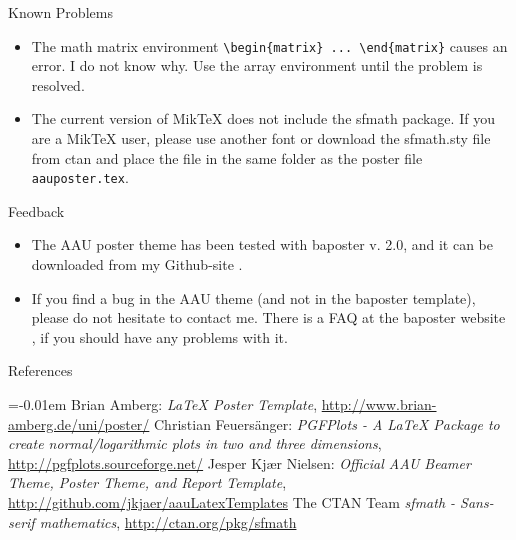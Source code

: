 \documentclass[a0paper,portrait]{baposter}
\begin{document}
\begin{poster}
\begin{posterbox}[name=problems,column=2,below=install]{Known Problems}
  \begin{itemize}
    \item The math matrix environment {\tt \textbackslash begin\{matrix\} ... \textbackslash end\{matrix\}} causes an error. I do not know why. Use the array environment until the problem is resolved.
    \item The current version of MikTeX does not include the sfmath package. If you are a MikTeX user, please use another font or download the sfmath.sty file from ctan \cite{ctan} and place the file in the same folder as the poster file {\tt aauposter.tex}.
  \end{itemize}
\end{posterbox}

\begin{posterbox}[name=feedback,column=2,below=problems]{Feedback}
  \begin{itemize}
    \item The AAU poster theme has been tested with baposter v. 2.0, and it can be downloaded from my Github-site \cite{jkngithub}.
    \item If you find a bug in the AAU theme (and not in the baposter template), please do not hesitate to contact me. There is a FAQ at the baposter website \cite{baposter}, if you should have any problems with it.
  \end{itemize}
\end{posterbox}

\begin{posterbox}[name=refs,column=2,below=feedback,above=bottom]{References}


\begin{thebibliography}{1}%
\itemsep=-0.01em%
\setlength{\baselineskip}{0.4em}%
 Brian Amberg: \emph{LaTeX Poster Template}, \url{http://www.brian-amberg.de/uni/poster/} 
 Christian Feuersänger: \emph{PGFPlots - A LaTeX Package to create normal/logarithmic plots in two and three dimensions}, \url{http://pgfplots.sourceforge.net/} 
 Jesper Kjær Nielsen: \emph{Official AAU Beamer Theme, Poster Theme, and Report Template}, \url{http://github.com/jkjaer/aauLatexTemplates}
 The CTAN Team  \emph{sfmath -  Sans-serif mathematics}, \url{http://ctan.org/pkg/sfmath}
\end{thebibliography}


%  
%   
\end{posterbox}

\end{poster}
\end{document}
